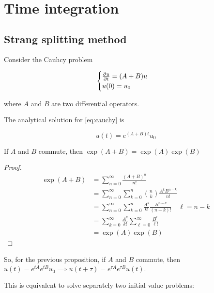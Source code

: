 \section{Time integration}

\subsection{Strang splitting method}

Consider the Cauhcy problem

\begin{equation}
    \begin{cases}
        \frac{\partial u}{\partial t} = (A + B) u \\
        u(0) = u_0
    \end{cases}
    \label{eq:cauchy}
\end{equation}

where $A$ and $B$ are two differential operators.

The analytical solution for \ref{eq:cauchy} is

\[ u(t) = e^{(A + B)t} u_0 \]

\begin{proposition}
    If $A$ and $B$ commute, then $\exp(A+B) = \exp(A)\exp(B)$
\end{proposition}

\begin{proof}
    
    \begin{align*}
        \exp(A + B) &= \sum_{n = 0}^\infty \frac{(A + B)^n}{n!} \\
                    &= \sum_{n = 0}^\infty \sum_{k = 0}^n \binom{n}{k} \frac{A^k B^{n-k}}{n!} \\
                    &= \sum_{n = 0}^\infty \sum_{k = 0}^n \frac{A^k}{k!} \frac{B^{n - k}}{(n - k)!}  \quad \ell = n - k \\
                    &= \sum_{k = 0}^\infty \frac{A^k}{k!} \sum_{\ell = 0}^\infty \frac{B^\ell}{\ell!} \\
                    &= \exp(A)\exp(B)
    \end{align*}

\end{proof}

So, for the previous proposition, if $A$ and $B$ commute, then $u(t) = e^{tA}e^{tB}u_0 \implies u(t + \tau) = e^{\tau A}e^{\tau B}u(t)$.

This is equivalent to solve separately two initial value problems:

